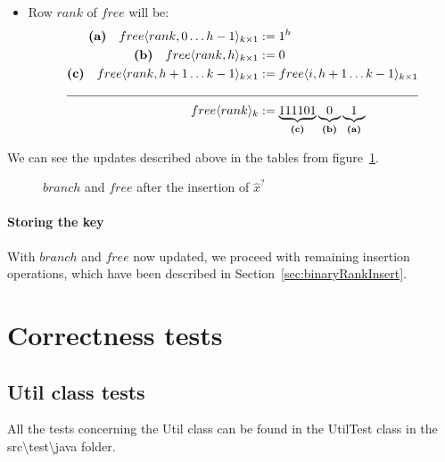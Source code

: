 \begin{enumerate}
\begin{itemize}
        \item
        Row $rank$ of $free$ will be:
        \begin{align*}
            \textbf{(a)}\quad free\langle rank, 0 \dots h - 1 \rangle_{k \times 1} &:= 1^h \\
            \textbf{(b)}\quad free\langle rank, h\rangle_{k \times 1} &:= 0 \\
            \textbf{(c)}\quad free\langle rank, h + 1 \dots k - 1\rangle_{k \times 1} &:= free\langle i, h + 1 \dots k - 1\rangle_{k \times 1} \\
            \cline{1-2}
            free\langle rank \rangle_k &:=\underbrace{111101}_{\textbf{(c)}} \underbrace{0}_{\textbf{(b)}} \underbrace{1}_{\textbf{(a)}}
        \end{align*}
    \end{itemize}

    We can see the updates described above in the tables from figure~\ref{fig:branchAndFreeAfterUpdatingValuesForRank}.
    \begin{figure}[H]
    \centering
    
    \caption[Example of $branch$ and $free$ after the insertion of a $\hat x^?$ ]{$branch$ and $free$ after the insertion of $\hat x^?$}
    \label{fig:branchAndFreeAfterUpdatingValuesForRank}
    \end{figure}
    
\end{enumerate}

\subsubsection{Storing the key} \label{sec:dontCaresInsert}

With $branch$ and $free$ now updated, we proceed with remaining insertion operations, which have been described in Section~\ref{sec:binaryRankInsert}.

\chapter{Correctness tests}

\section{{\ttfamily Util} class tests}

All the tests concerning the {\ttfamily Util} class can be found in the {\ttfamily UtilTest} class in the {\ttfamily src\textbackslash test\textbackslash java} folder.

